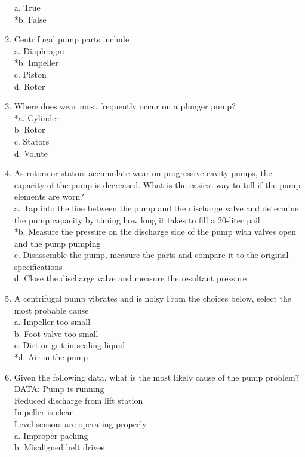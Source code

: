\begin{enumerate}[1.]
a. True\\
*b. False\\
\item Centrifugal pump parts include\\
a. Diaphragm\\
*b. Impeller\\
c. Piston\\
d. Rotor\\
\item Where does wear most frequently occur on a plunger pump?\\
*a. Cylinder\\
b. Rotor\\
c. Stators\\
d. Volute\\
\item As rotors or stators accumulate wear on progressive cavity pumps, the capacity of the pump is decreased. What is the easiest way to tell if the pump elements are worn?\\
a. Tap into the line between the pump and the discharge valve and determine the pump capacity by timing how long it takes to fill a 20-liter pail\\
*b. Measure the pressure on the discharge side of the pump with valves open and the pump pumping\\
c. Disassemble the pump, measure the parts and compare it to the original specifications\\
d. Close the discharge valve and measure the resultant pressure\\
\item A centrifugal pump vibrates and is noisy From the choices below, select the most probable cause\\
a. Impeller too small\\
b. Foot valve too small\\
c. Dirt or grit in sealing liquid\\
*d. Air in the pump\\
\item Given the following data, what is the most likely cause of the pump problem?\\
DATA: Pump is running\\
Reduced discharge from lift station\\
Impeller is clear\\
Level sensors are operating properly\\
a. Improper packing\\
b. Misaligned belt drives\\

\end{enumerate}

